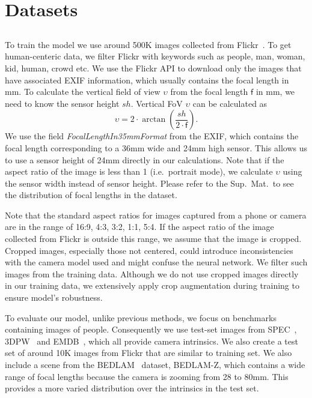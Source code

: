 \section{Datasets}


\subsection{\cameramodel}
\label{sec:HumanFoV}
To train the \cameramodel model we use around 500K images collected from Flickr~\cite{flickr}. To get human-centeric data, we filter Flickr with keywords such as people, man, woman, kid, human, crowd etc. 
We use the Flickr API to download only the images that have associated EXIF information, which usually contains the focal length in mm. 
To calculate the vertical field of view $\upsilon$ from the focal length $\mathsf{f}$ in mm, we need to know the sensor height $sh$. Vertical FoV $\upsilon$ can be calculated as
\begin{equation}
     \upsilon = 2 \cdot \arctan\left(\frac{sh}{2 \cdot \mathsf{f}}\right).
\end{equation}
We use the field \textit{FocalLengthIn35mmFormat} from the EXIF, which contains the focal length corresponding to a 36mm wide and 24mm high sensor. This allows us to use a sensor height of 24mm directly in our calculations. Note that if the aspect ratio of the image is less than 1 (i.e.~portrait mode), we calculate $\upsilon$ using the sensor width instead of sensor height. Please refer to the Sup.~Mat.~to see the distribution of focal lengths in the dataset.


Note that the standard aspect ratios for images captured from a phone or camera are in the range of 16:9, 4:3, 3:2, 1:1, 5:4. If the aspect ratio of the image collected from Flickr is outside this range, we assume that the image is cropped. Cropped images, especially those not centered, could introduce inconsistencies with the camera model used and  might confuse the neural network. We filter such images from the training data. Although we do not use cropped images directly in our training data, we extensively apply crop augmentation during training to ensure model's robustness.

To evaluate our \cameramodel model, unlike previous methods, we focus on benchmarks containing images of people. Consequently we use test-set images from SPEC~\cite{spec}, 3DPW~\cite{3dpw} and EMDB~\cite{emdb}, which all provide camera intrinsics. 
We also create a test set of around 10K images from Flickr that are similar to training set. 
We also include a scene from the BEDLAM~\cite{bedlam} dataset, BEDLAM-Z, which contains a wide range of focal lengths because the camera is zooming from 28 to 80mm. This provides a more varied distribution over the intrinsics in the test set.


